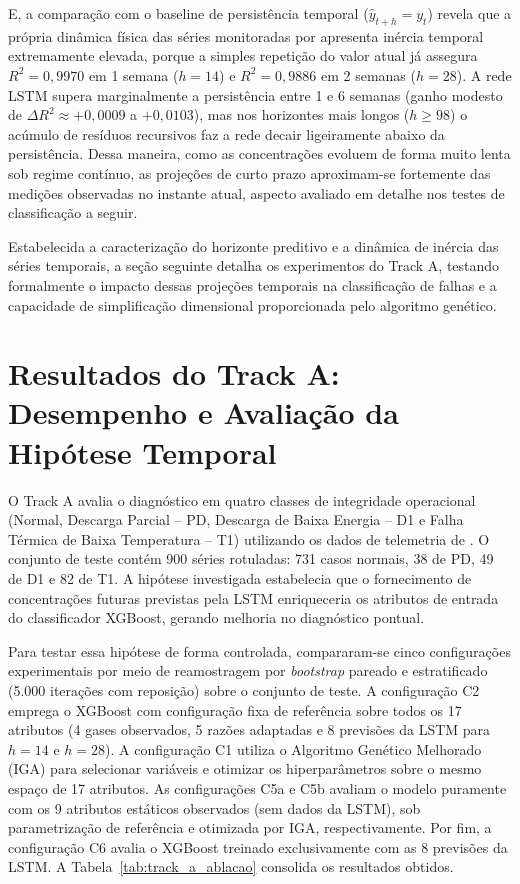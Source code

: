 E, a comparação com o baseline de persistência temporal ($\hat{y}_{t+h} = y_t$) revela que a própria dinâmica física das séries monitoradas por  apresenta inércia temporal extremamente elevada, porque a simples repetição do valor atual já assegura $R^2 = 0,9970$ em 1 semana ($h = 14$) e $R^2 = 0,9886$ em 2 semanas ($h = 28$). A rede LSTM supera marginalmente a persistência entre 1 e 6 semanas (ganho modesto de $\Delta R^2 \approx +0,0009$ a $+0,0103$), mas nos horizontes mais longos ($h \ge 98$) o acúmulo de resíduos recursivos faz a rede decair ligeiramente abaixo da persistência. Dessa maneira, como as concentrações evoluem de forma muito lenta sob regime contínuo, as projeções de curto prazo aproximam-se fortemente das medições observadas no instante atual, aspecto avaliado em detalhe nos testes de classificação a seguir.

Estabelecida a caracterização do horizonte preditivo e a dinâmica de inércia das séries temporais, a seção seguinte detalha os experimentos do Track A, testando formalmente o impacto dessas projeções temporais na classificação de falhas e a capacidade de simplificação dimensional proporcionada pelo algoritmo genético.

\section{Resultados do Track A: Desempenho e Avaliação da Hipótese Temporal}\label{sec:res_track_a}

O Track A avalia o diagnóstico em quatro classes de integridade operacional (Normal, Descarga Parcial -- PD, Descarga de Baixa Energia -- D1 e Falha Térmica de Baixa Temperatura -- T1) utilizando os dados de telemetria de . O conjunto de teste contém 900 séries rotuladas: 731 casos normais, 38 de PD, 49 de D1 e 82 de T1. A hipótese investigada estabelecia que o fornecimento de concentrações futuras previstas pela LSTM enriqueceria os atributos de entrada do classificador XGBoost, gerando melhoria no diagnóstico pontual.

Para testar essa hipótese de forma controlada, compararam-se cinco configurações experimentais por meio de reamostragem por \textit{bootstrap} pareado e estratificado (5.000 iterações com reposição) sobre o conjunto de teste. A configuração C2 emprega o XGBoost com configuração fixa de referência sobre todos os 17 atributos (4 gases observados, 5 razões adaptadas e 8 previsões da LSTM para $h=14$ e $h=28$). A configuração C1 utiliza o Algoritmo Genético Melhorado (IGA) para selecionar variáveis e otimizar os hiperparâmetros sobre o mesmo espaço de 17 atributos. As configurações C5a e C5b avaliam o modelo puramente com os 9 atributos estáticos observados (sem dados da LSTM), sob parametrização de referência e otimizada por IGA, respectivamente. Por fim, a configuração C6 avalia o XGBoost treinado exclusivamente com as 8 previsões da LSTM. A Tabela~\ref{tab:track_a_ablacao} consolida os resultados obtidos.

